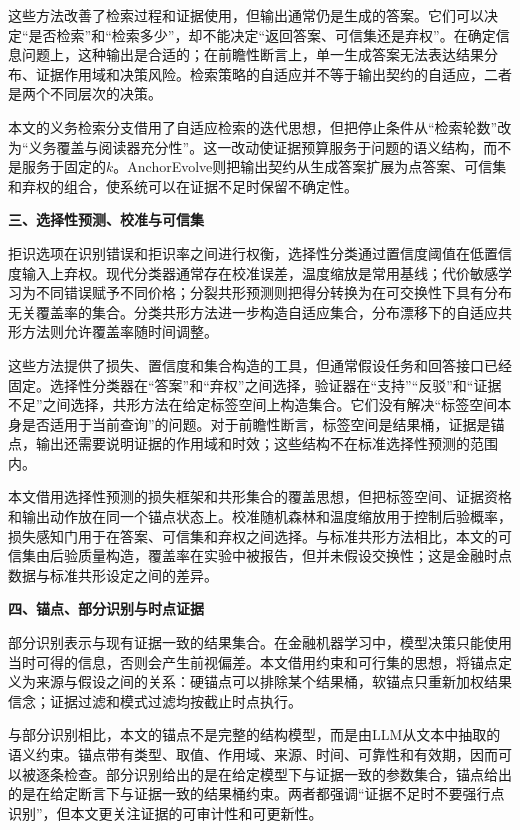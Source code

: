 这些方法改善了检索过程和证据使用，但输出通常仍是生成的答案。它们可以决定“是否检索”和“检索多少”，却不能决定“返回答案、可信集还是弃权”。在确定信息问题上，这种输出是合适的；在前瞻性断言上，单一生成答案无法表达结果分布、证据作用域和决策风险。检索策略的自适应并不等于输出契约的自适应，二者是两个不同层次的决策。

本文的义务检索分支借用了自适应检索的迭代思想，但把停止条件从“检索轮数”改为“义务覆盖与阅读器充分性”。这一改动使证据预算服务于问题的语义结构，而不是服务于固定的$k$。AnchorEvolve则把输出契约从生成答案扩展为点答案、可信集和弃权的组合，使系统可以在证据不足时保留不确定性。

\noindent\textbf{三、选择性预测、校准与可信集}

拒识选项在识别错误和拒识率之间进行权衡\citep{chow1970optimum}，选择性分类通过置信度阈值在低置信度输入上弃权\citep{geifman2017selective}。现代分类器通常存在校准误差，温度缩放是常用基线\citep{guo2017calibration}；代价敏感学习为不同错误赋予不同价格\citep{elkan2001cost}；分裂共形预测则把得分转换为在可交换性下具有分布无关覆盖率的集合\citep{vovk2005algorithmic,angelopoulos2021gentle}。分类共形方法进一步构造自适应集合\citep{romano2020classification}，分布漂移下的自适应共形方法则允许覆盖率随时间调整\citep{gibbs2021adaptive}。

这些方法提供了损失、置信度和集合构造的工具，但通常假设任务和回答接口已经固定。选择性分类器在“答案”和“弃权”之间选择，验证器在“支持”“反驳”和“证据不足”之间选择，共形方法在给定标签空间上构造集合。它们没有解决“标签空间本身是否适用于当前查询”的问题。对于前瞻性断言，标签空间是结果桶，证据是锚点，输出还需要说明证据的作用域和时效；这些结构不在标准选择性预测的范围内。

本文借用选择性预测的损失框架和共形集合的覆盖思想，但把标签空间、证据资格和输出动作放在同一个锚点状态上。校准随机森林和温度缩放用于控制后验概率，损失感知门用于在答案、可信集和弃权之间选择。与标准共形方法相比，本文的可信集由后验质量构造，覆盖率在实验中被报告，但并未假设交换性；这是金融时点数据与标准共形设定之间的差异。

\noindent\textbf{四、锚点、部分识别与时点证据}

部分识别表示与现有证据一致的结果集合\citep{manski2003partial}。在金融机器学习中，模型决策只能使用当时可得的信息，否则会产生前视偏差\citep{lopezdeprado2018advances}。本文借用约束和可行集的思想，将锚点定义为来源与假设之间的关系：硬锚点可以排除某个结果桶，软锚点只重新加权结果信念；证据过滤和模式过滤均按截止时点执行。

与部分识别相比，本文的锚点不是完整的结构模型，而是由LLM从文本中抽取的语义约束。锚点带有类型、取值、作用域、来源、时间、可靠性和有效期，因而可以被逐条检查。部分识别给出的是在给定模型下与证据一致的参数集合，锚点给出的是在给定断言下与证据一致的结果桶约束。两者都强调“证据不足时不要强行点识别”，但本文更关注证据的可审计性和可更新性。

